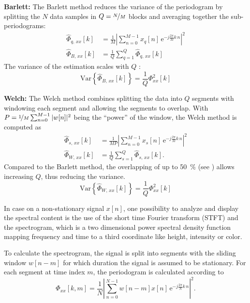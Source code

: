 \textbf{Barlett:} The Barlett method reduces the variance of the periodogram by splitting the $N$ data samples in $Q=\nicefrac{N}{M}$ blocks and averaging together the sub-periodograms:
\begin{align}
\hat{\Phi}_{q,\,xx}[k] &= \frac{1}{M} \left| \sum_{n=0}^{M-1} x_q[n]\,\text{e}^{-j\frac{2\pi}{M}k\,n}\right|^2\\
\hat{\Phi}_{B,\,xx}[k] &= \frac{1}{Q} \sum_{q=1}^{Q} \hat{\Phi}_{q,\,xx}[k]
\end{align}
The variance of the estimation scales with $Q$ \cite[p.~6]{Rowell2008}:
\begin{equation}
\text{Var}\left\{\hat{\Phi}_{B,\,xx}[k]\right\} = \frac{1}{Q}\Phi_{xx}^2[k]
\end{equation}

\textbf{Welch:} The Welch method combines splitting the data into $Q$ segments with windowing each segment and allowing the segments to overlap. With $P = \nicefrac{1}{M} \sum_{n=0}^{M-1} |w[n]|^2$ being the ``power'' of the window, the Welch method is computed as
\begin{align}
\hat{\Phi}_{s,\,xx}[k] &= \frac{1}{M P} \left| \sum_{n=0}^{M-1} x_s[n]\,\text{e}^{-j\frac{2\pi}{M}k\,n}\right|^2\\
\hat{\Phi}_{W,\,xx}[k] &= \frac{1}{Q} \sum_{s=1}^{Q} \hat{\Phi}_{s,\,xx}[k].
\end{align}
Compared to the Barlett method, the overlapping of up to \SI{50}{\percent} (see \cite{Welch1967}) allows increasing $Q$, thus reducing the variance.
\begin{equation}\label{eq:varWelch}
\text{Var}\left\{\hat{\Phi}_{W,\,xx}[k]\right\} = \frac{1}{Q}\Phi_{xx}^2[k]
\end{equation}


In case on a non-stationary signal $x[n]$, one possibility to analyze and display the spectral content is the use of the short time Fourier transform (STFT) and the spectrogram, which is a two dimensional power spectral density function mapping frequency and time to a third coordinate like height, intensity or color.

To calculate the spectrogram, the signal is split into segments with the sliding window $w[n-m]$ for which duration the signal is assumed to be stationary. For each segment at time index $m$, the periodogram is calculated according to
\begin{equation}
\hat{\Phi}_{xx}[k,m] = \frac{1}{N} \left| \sum_{n=0}^{N-1} w[n-m] x[n]\,\text{e}^{-j\frac{2\pi}{N}k\,n}\right|^2.
\end{equation}









